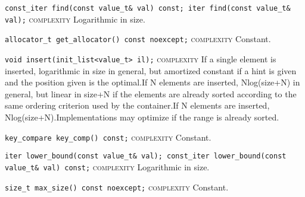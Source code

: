 \noindent{}\hspace*{0.25em}\lstinline[basicstyle=\ttfamily\color{clime}]{const_iter find(const value_t& val) const; iter find(const value_t& val);} \textsc{complexity} Logarithmic in size.\\\vspace{-0.6em}

\noindent{}\hspace*{0.25em}\lstinline[basicstyle=\ttfamily\color{cgreen}]{allocator_t get_allocator() const noexcept;} \textsc{complexity} Constant.\\\vspace{-0.6em}

\noindent{}\hspace*{0.25em}\lstinline[basicstyle=\ttfamily\color{corange}]{void insert(init_list<value_t> il);} \textsc{complexity} If a single element is inserted, logarithmic in size in general, but amortized constant if a hint is given and the position given is the optimal.If N elements are inserted, Nlog(size+N) in general, but linear in size+N if the elements are already sorted according to the same ordering criterion used by the container.If N elements are inserted, Nlog(size+N).Implementations may optimize if the range is already sorted.\\\vspace{-0.6em}

\noindent{}\hspace*{0.25em}\lstinline[basicstyle=\ttfamily\color{cgreen}]{key_compare key_comp() const;} \textsc{complexity} Constant.\\\vspace{-0.6em}

\noindent{}\hspace*{0.25em}\lstinline[basicstyle=\ttfamily\color{clime}]{iter lower_bound(const value_t& val); const_iter lower_bound(const value_t& val) const;} \textsc{complexity} Logarithmic in size.\\\vspace{-0.6em}

\noindent{}\hspace*{0.25em}\lstinline[basicstyle=\ttfamily\color{cgreen}]{size_t max_size() const noexcept;} \textsc{complexity} Constant.\\\vspace{-0.6em}

